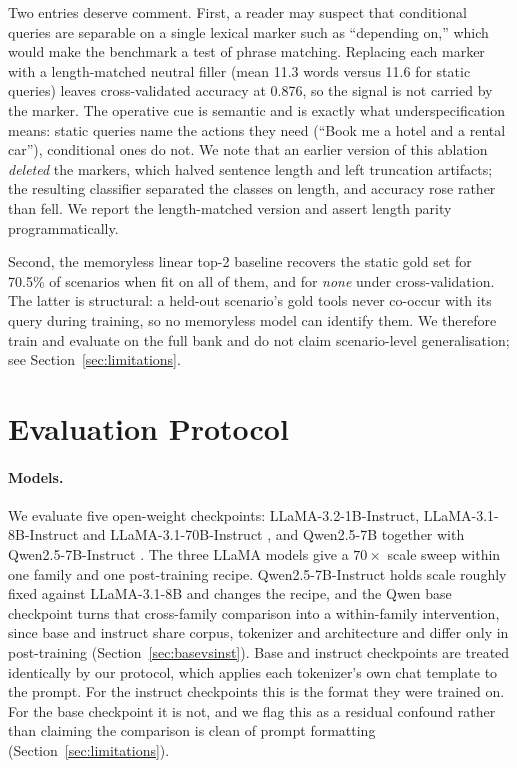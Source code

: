\documentclass[11pt]{article}
\begin{document}
Two entries deserve comment. First, a reader may suspect that conditional queries
are separable on a single lexical marker such as ``depending on,'' which would make
the benchmark a test of phrase matching. Replacing each marker with a
length-matched neutral filler (mean 11.3 words versus 11.6 for static queries)
leaves cross-validated accuracy at 0.876, so the signal is not carried by the
marker. The operative cue is semantic and is exactly what underspecification
means: static queries name the actions they need (``Book me a hotel and a rental
car''), conditional ones do not. We note that an earlier version of this ablation
\emph{deleted} the markers, which halved sentence length and left truncation
artifacts; the resulting classifier separated the classes on length, and accuracy
rose rather than fell. We report the length-matched version and assert length
parity programmatically.

Second, the memoryless linear top-2 baseline recovers the static gold set for
70.5\% of scenarios when fit on all of them, and for \emph{none} under
cross-validation. The latter is structural: a held-out scenario's gold tools never
co-occur with its query during training, so no memoryless model can identify them.
We therefore train and evaluate on the full bank and do not claim
scenario-level generalisation; see Section~\ref{sec:limitations}.

\section{Evaluation Protocol}
\label{sec:protocol}

\paragraph{Models.}
We evaluate five open-weight checkpoints: LLaMA-3.2-1B-Instruct,
LLaMA-3.1-8B-Instruct and LLaMA-3.1-70B-Instruct \citep{grattafiori2024llama3},
and Qwen2.5-7B together with Qwen2.5-7B-Instruct \citep{qwen2024qwen25}. The
three LLaMA models give a $70\times$ scale sweep within one family and one
post-training recipe. Qwen2.5-7B-Instruct holds scale roughly fixed against
LLaMA-3.1-8B and changes the recipe, and the Qwen base checkpoint turns that
cross-family comparison into a within-family intervention, since base and instruct
share corpus, tokenizer and architecture and differ only in post-training
(Section~\ref{sec:basevsinst}). Base and instruct checkpoints are treated
identically by our protocol, which applies each tokenizer's own chat template to
the prompt. For the instruct checkpoints this is the format they were trained on.
For the base checkpoint it is not, and we flag this as a residual confound rather
than claiming the comparison is clean of prompt formatting
(Section~\ref{sec:limitations}).
\end{document}
